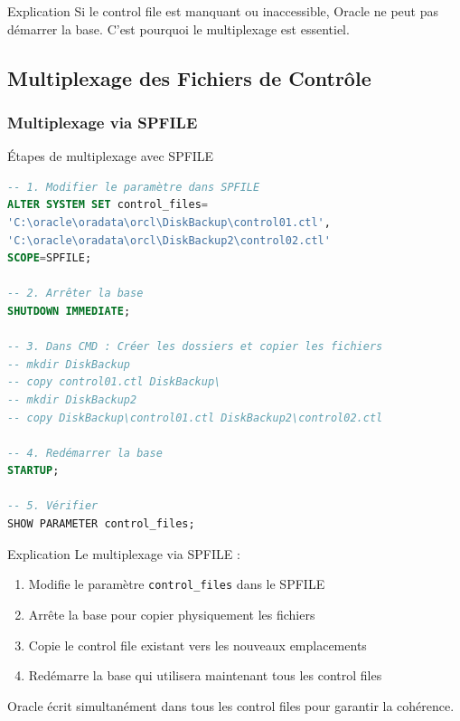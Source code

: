 \documentclass[12pt,a4paper]{article}
\begin{document}
\begin{explication}{Explication}
Si le control file est manquant ou inaccessible, Oracle ne peut pas démarrer la base. C'est pourquoi le multiplexage est essentiel.
\end{explication}

\subsection{Multiplexage des Fichiers de Contrôle}

\subsubsection{Multiplexage via SPFILE}

\begin{commande}{Étapes de multiplexage avec SPFILE}
\begin{lstlisting}[language=SQL]
-- 1. Modifier le paramètre dans SPFILE
ALTER SYSTEM SET control_files=
'C:\oracle\oradata\orcl\DiskBackup\control01.ctl',
'C:\oracle\oradata\orcl\DiskBackup2\control02.ctl'
SCOPE=SPFILE;

-- 2. Arrêter la base
SHUTDOWN IMMEDIATE;

-- 3. Dans CMD : Créer les dossiers et copier les fichiers
-- mkdir DiskBackup
-- copy control01.ctl DiskBackup\
-- mkdir DiskBackup2
-- copy DiskBackup\control01.ctl DiskBackup2\control02.ctl

-- 4. Redémarrer la base
STARTUP;

-- 5. Vérifier
SHOW PARAMETER control_files;
\end{lstlisting}
\end{commande}

\begin{explication}{Explication}
Le multiplexage via SPFILE :
\begin{enumerate}
    \item Modifie le paramètre \texttt{control\_files} dans le SPFILE
    \item Arrête la base pour copier physiquement les fichiers
    \item Copie le control file existant vers les nouveaux emplacements
    \item Redémarre la base qui utilisera maintenant tous les control files
\end{enumerate}
Oracle écrit simultanément dans tous les control files pour garantir la cohérence.
\end{explication}
\end{document}
